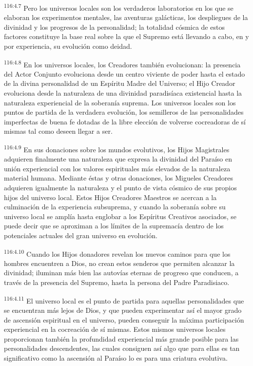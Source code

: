 \par
\textsuperscript{116:4.7} Pero los universos locales son los verdaderos laboratorios en los que se elaboran los experimentos mentales, las aventuras galácticas, los despliegues de la divinidad y los progresos de la personalidad; la totalidad cósmica de estos factores constituye la base real sobre la que el Supremo está llevando a cabo, en y por experiencia, su evolución como deidad.

\par
\textsuperscript{116:4.8} En los universos locales, los Creadores también evolucionan: la presencia del Actor Conjunto evoluciona desde un centro viviente de poder hasta el estado de la divina personalidad de un Espíritu Madre del Universo; el Hijo Creador evoluciona desde la naturaleza de una divinidad paradisíaca existencial hasta la naturaleza experiencial de la soberanía suprema. Los universos locales son los puntos de partida de la verdadera evolución, los semilleros de las personalidades imperfectas de buena fe dotadas de la libre elección de volverse cocreadoras de sí mismas tal como deseen llegar a ser.

\par
\textsuperscript{116:4.9} En sus donaciones sobre los mundos evolutivos, los Hijos Magistrales adquieren finalmente una naturaleza que expresa la divinidad del Paraíso en unión experiencial con los valores espirituales más elevados de la naturaleza material humana. Mediante éstas y otras donaciones, los Migueles Creadores adquieren igualmente la naturaleza y el punto de vista cósmico de sus propios hijos del universo local. Estos Hijos Creadores Maestros se acercan a la culminación de la experiencia subsuprema, y cuando la soberanía sobre su universo local se amplía hasta englobar a los Espíritus Creativos asociados, se puede decir que se aproximan a los límites de la supremacía dentro de los potenciales actuales del gran universo en evolución.

\par
\textsuperscript{116:4.10} Cuando los Hijos donadores revelan los nuevos caminos para que los hombres encuentren a Dios, no crean estos senderos que permiten alcanzar la divinidad; iluminan más bien las autovías eternas de progreso que conducen, a través de la presencia del Supremo, hasta la persona del Padre Paradisiaco.

\par
\textsuperscript{116:4.11} El universo local es el punto de partida para aquellas personalidades que se encuentran más lejos de Dios, y que pueden experimentar así el mayor grado de ascensión espiritual en el universo, pueden conseguir la máxima participación experiencial en la cocreación de sí mismas. Estos mismos universos locales proporcionan también la profundidad experiencial más grande posible para las personalidades descendentes, las cuales consiguen así algo que para ellas es tan significativo como la ascensión al Paraíso lo es para una criatura evolutiva.

